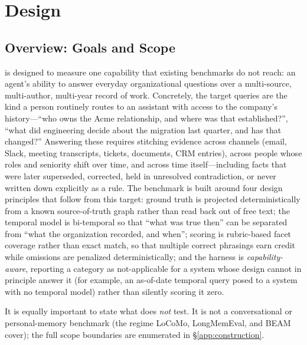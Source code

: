 \section{\bench{} Design}
\label{sec:design}

\subsection{Overview: Goals and Scope}
\label{sec:design:overview}

\bench{} is designed to measure one capability that existing benchmarks do not
reach: an agent's ability to answer everyday organizational questions over a
multi-source, multi-author, multi-year record of work. Concretely, the target
queries are the kind a person routinely routes to an assistant with access to
the company's history---``who owns the Acme relationship, and where was that
established?'', ``what did engineering decide about the migration last quarter,
and has that changed?''
Answering these requires stitching evidence across channels (email, Slack,
meeting transcripts, tickets, documents, CRM entries), across people whose roles
and seniority shift over time, and across time itself---including facts that
were later superseded, corrected, held in unresolved contradiction, or never
written down explicitly as a rule. The benchmark is built around four design
principles that follow from this target: ground truth is projected
deterministically from a known source-of-truth graph rather than read back out
of free text; the temporal model is bi-temporal so that ``what was true then''
can be separated from ``what the organization recorded, and when''; scoring is
rubric-based facet coverage rather than exact match, so that multiple correct
phrasings earn credit while omissions are penalized deterministically; and the
harness is \emph{capability-aware}, reporting a category as not-applicable for a
system whose design cannot in principle answer it (for example, an as-of-date
temporal query posed to a system with no temporal model) rather than silently
scoring it zero.

It is equally important to state what \bench{} does \emph{not} test. It is not a
conversational or personal-memory benchmark (the regime LoCoMo, LongMemEval, and
BEAM cover); the full scope boundaries are enumerated in
\S\ref{app:construction}.

